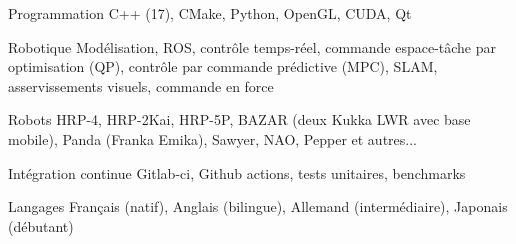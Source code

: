 

\begin{cvskills}

  \cvskill
    {Programmation} %
    {C++ (17), CMake, Python, OpenGL, CUDA, Qt} %

  \cvskill
    {Robotique} %
    {Modélisation, ROS, contrôle temps-réel, commande espace-tâche par optimisation (QP), contrôle par commande prédictive (MPC), SLAM, asservissements visuels, commande en force} %

  \cvskill
    {Robots} %
    {HRP-4, HRP-2Kai, HRP-5P, BAZAR (deux Kukka LWR avec base mobile), Panda (Franka Emika), Sawyer, NAO, Pepper et autres...} %

  \cvskill
    {Intégration continue} %
    {Gitlab-ci, Github actions, tests unitaires, benchmarks} %

  \cvskill
    {Langages} %
    {Français (natif), Anglais (bilingue), Allemand (intermédiaire), Japonais (débutant)} %

\end{cvskills}
